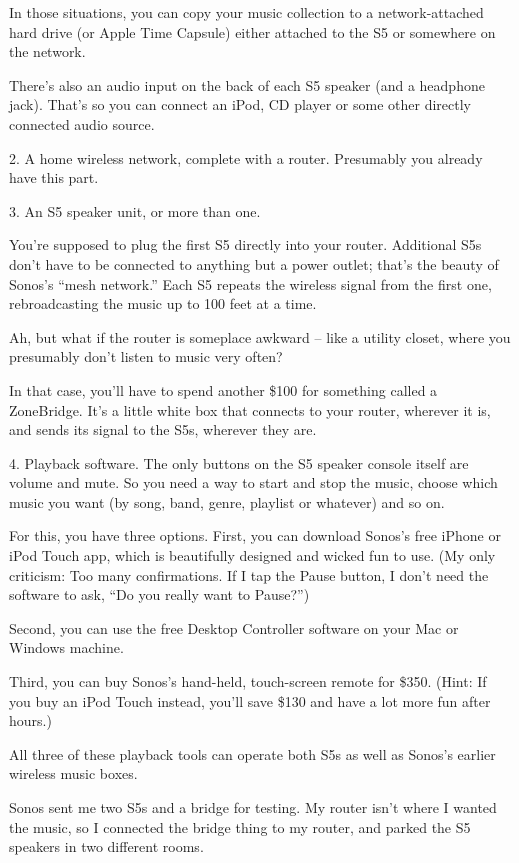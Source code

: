 ﻿\documentclass[12pt]{article}
\begin{document}
In those situations, you can copy your music collection to a network-attached hard drive (or Apple
Time Capsule) either attached to the S5 or somewhere on the network.

There's also an audio input on the back of each S5 speaker (and a headphone jack). That's so you can
connect an iPod, CD player or some other directly connected audio source.

2. A home wireless network, complete with a router. Presumably you already have this part.

3. An S5 speaker unit, or more than one.

You're supposed to plug the first S5 directly into your router. Additional S5s don't have to be
connected to anything but a power outlet; that's the beauty of Sonos's ``mesh network.'' Each S5
repeats the wireless signal from the first one, rebroadcasting the music up to 100 feet at a time.

Ah, but what if the router is someplace awkward -- like a utility closet, where you presumably don't
listen to music very often?

In that case, you'll have to spend another \$100 for something called a ZoneBridge. It's a little
white box that connects to your router, wherever it is, and sends its signal to the S5s, wherever
they are.

4. Playback software. The only buttons on the S5 speaker console itself are volume and mute. So you
need a way to start and stop the music, choose which music you want (by song, band, genre, playlist
or whatever) and so on.

For this, you have three options. First, you can download Sonos's free iPhone or iPod Touch app,
which is beautifully designed and wicked fun to use. (My only criticism: Too many confirmations. If
I tap the Pause button, I don't need the software to ask, ``Do you really want to Pause?'')

Second, you can use the free Desktop Controller software on your Mac or Windows machine.

Third, you can buy Sonos's hand-held, touch-screen remote for \$350. (Hint: If you buy an iPod Touch
instead, you'll save \$130 and have a lot more fun after hours.)

All three of these playback tools can operate both S5s as well as Sonos's earlier wireless music
boxes.

Sonos sent me two S5s and a bridge for testing. My router isn't where I wanted the music, so I
connected the bridge thing to my router, and parked the S5 speakers in two different rooms.
\end{document}
